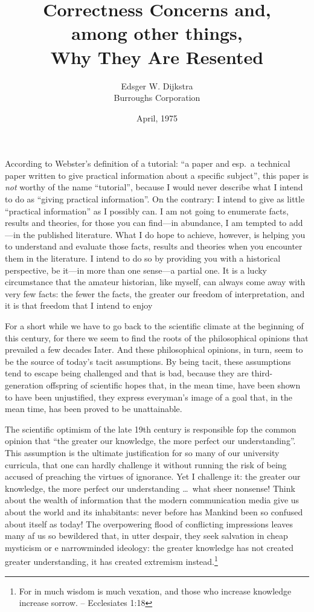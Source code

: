 \documentclass[10pt,letterpaper,twocolumn]{article}
\title{Correctness Concerns and,\\
among other things,\\
Why They Are Resented}
\author{Edsger W. Dijkstra\\
Burroughs Corporation}
\date{April, 1975}
\begin{document}
\maketitle

\noindent According to Webster's definition of a tutorial: ``a paper and esp.~a technical paper written 
to give practical information about a specific subject'', this paper is \emph{not} worthy of the name
``tutorial'', because I would never describe what I intend 
to do as ``giving practical information''. On the 
contrary: I intend to give as little ``practical 
information'' as I possibly can. I am not going to 
enumerate facts, results and theories, for those 
you can find---in abundance, I am tempted to add---in the published literature. What I do hope to 
achieve, however, is helping you to understand and 
evaluate those facts, results and theories when 
you encounter them in the literature. I intend to 
do so by providing you with a historical perspective, be it---in more than one sense---a partial 
one. It is a lucky circumstance that the amateur 
historian, like myself, can always come away with 
very few facts: the fewer the facts, the greater 
our freedom of interpretation, and it is that freedom that I intend to enjoy

For a short while we have to go back to the 
scientific climate at the beginning of this century, for there we seem to find the roots of the 
philosophical opinions that prevailed a few decades Iater. And these philosophical opinions, in 
turn, seem to be the source of today's tacit assumptions. By being tacit, these assumptions tend to 
escape being challenged and that is bad, because 
they are third-generation offspring of scientific 
hopes that, in the mean time, have been shown to 
have been unjustified, they express everyman's image 
of a goal that, in the mean time, has been proved 
to be unattainable. 

The scientific optimism of the late 19th century is responsible fop the common opinion that ``the 
greater our knowledge, the more perfect our understanding''. This assumption is the ultimate justification for so many of our university curricula, that 
one can hardly challenge it without running the risk 
of being accused of preaching the virtues of ignorance. Yet I challenge it: the greater our knowledge, 
the more perfect our understanding \ldots\ what sheer 
nonsense! Think about the wealth of information 
that the modern communication media give us about 
the world and its inhabitants: never before has Mankind been so confused about itself as today! 
The overpowering flood of conflicting impressions 
leaves many af us so bewildered that, in utter despair, they seek salvation in cheap mysticism or 
e narrowminded ideology: the greater knowledge 
has not created greater understanding, it has created extremism instead.\footnote{For in much wisdom is much vexation, and those who increase knowledge increase sorrow. -- Ecclesiates 1:18}
\end{document}

